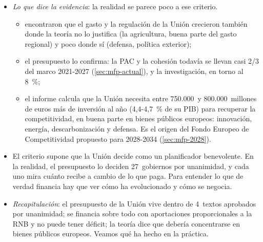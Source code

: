 \documentclass[11pt]{article}
\begin{document}
\begin{itemize}
\begin{itemize}
  \item \emph{no hacer lo que los Estados hacen bien solos}: si las preferencias difieren y los efectos se quedan dentro, mejor el nivel nacional ();
  \item \emph{la redistribución entre Estados} tiene otra justificación, la cohesión de un mercado único y de una moneda común ;
  \item \emph{la estabilización} apenas está: con un presupuesto del 1~\% de la RNB y sin déficit, la Unión no puede amortiguar los ciclos. El NextGenerationEU fue la primera excepción (\ref{sec:ngeu}).
  \end{itemize}
\item \emph{Lo que dice la evidencia}: la realidad se parece poco a ese criterio.
  \begin{itemize}
  \item \textcite{AlesinaAngeloniSchuknecht2005} encontraron que el gasto y la regulación de la Unión crecieron también donde la teoría no lo justifica (la agricultura, buena parte del gasto regional) y poco donde sí (defensa, política exterior);
  \item el presupuesto lo confirma: la PAC y la cohesión todavía se llevan casi 2/3 del marco 2021-2027 (\ref{sec:mfp-actual}), y la investigación, en torno al 8~\%;
  \item el informe \textcite{Draghi2024Future} calcula que la Unión necesita entre 750.000~y 800.000~millones de euros más de inversión al año (4,4-4,7~\% de su PIB) para recuperar la competitividad, en buena parte en bienes públicos europeos: innovación, energía, descarbonización y defensa. Es el origen del Fondo Europeo de Competitividad propuesto para 2028-2034 (\ref{sec:mfp-2028}).
  \end{itemize}
\item El criterio supone que la Unión decide como un planificador benevolente. En la realidad, el presupuesto lo deciden 27~gobiernos por unanimidad, y cada uno mira cuánto recibe a cambio de lo que paga. Para entender lo que de verdad financia hay que ver cómo ha evolucionado y cómo se negocia.
\end{itemize}

\begin{itemize}
\item \emph{Recapitulación}: el presupuesto de la Unión vive dentro de 4~textos aprobados por unanimidad; se financia sobre todo con aportaciones proporcionales a la RNB y no puede tener déficit; la teoría dice que debería concentrarse en bienes públicos europeos. Veamos qué ha hecho en la práctica.
\end{itemize}
\end{document}
